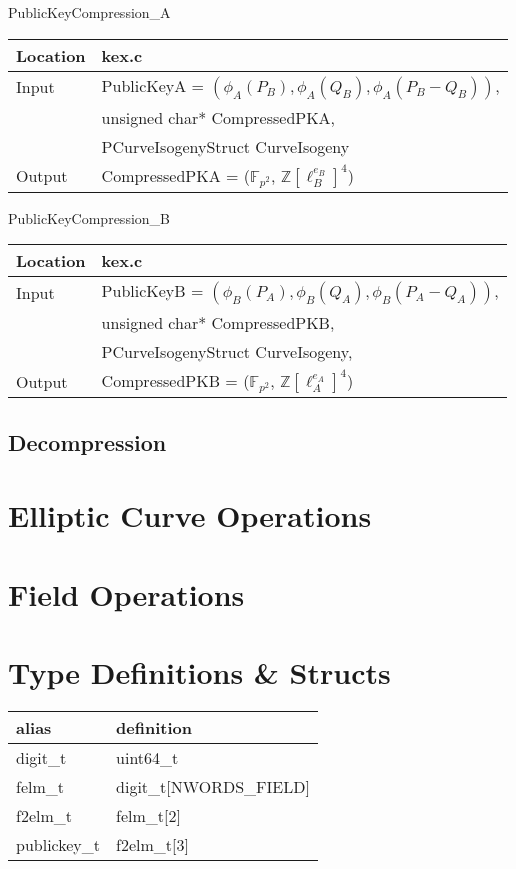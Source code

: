 \documentclass[10pt]{article}
\begin{document}
\vspace{5mm}

\parbox[t]{.40\linewidth}{
\centering
\small
PublicKeyCompression\_A
\begin{tabular}{@{}ll@{}}
	\toprule
	Location & kex.c \\
	\midrule
	Input & PublicKeyA = $(\phi_{A}(P_B),\phi_{A}(Q_B),\phi_{A}(P_B-Q_B))$,\\
	& unsigned char* CompressedPKA,\\
	& PCurveIsogenyStruct CurveIsogeny\\
	\midrule
	Output & CompressedPKA = ($\mathbb{F}_{p^2}$, $\mathbb{Z}[\ell_{B}^{e_B}]^{4}$)\\
	\bottomrule
\end{tabular}}
\hfill
\parbox[t]{.40\linewidth}{
\centering
\small
PublicKeyCompression\_B
\begin{tabular}{@{}ll@{}}
	\toprule
	Location & kex.c \\
	\midrule
	Input & PublicKeyB = $(\phi_{B}(P_A),\phi_{B}(Q_A),\phi_{B}(P_A-Q_A))$,\\
	& unsigned char* CompressedPKB,\\
	& PCurveIsogenyStruct CurveIsogeny,\\
	\midrule
	Output & CompressedPKB = ($\mathbb{F}_{p^2}$, $\mathbb{Z}[\ell_{A}^{e_A}]^{4}$)\\
	\bottomrule
\end{tabular}}

\subsection{Decompression}

\section{Elliptic Curve Operations}

\section{Field Operations}

\section{Type Definitions \& Structs}

\begin{center}
\begin{tabular}{@{}ll@{}}
	\toprule
	alias & definition \\
	\midrule
	digit\_t & uint64\_t\\
	felm\_t & digit\_t[NWORDS\_FIELD]\\
	f2elm\_t & felm\_t[2]\\
	publickey\_t & f2elm\_t[3]\\
	\bottomrule
\end{tabular}
\end{center}
\end{document}
